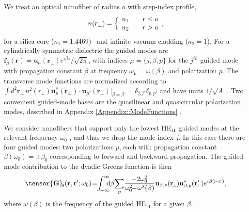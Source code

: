 \documentclass[preprint, aps,pra,onecolumn]{revtex4-1} %
\def\br{\mathbf{r}}
\newcommand{\mbf}[1]{\mathbf{#1}}
\begin{document}
We treat an optical nanofiber of radius $a$ with step-index profile,
	\begin{align} \label{Eq::IndexofRefraction}
		n(r_\perp) = \Big\{  
			\begin{array}{l l} n_1 & \quad r \leq a \\
						 n_2 & \quad r > a 
		\end{array},
	\end{align}
for a silica core ($n_1 = 1.4469$)~\cite{kien_field_2004} and infinite vacuum cladding ($n_2 = 1$).  For a cylindrically symmetric dielectric the guided modes are $\mathbf{f}_\mu (\br) = \mathbf{u}_\mu (\br_\perp) e^{i\beta z}/\sqrt{2 \pi}$, with indices $\mu=\{j, \beta , p\}$ for the $j^{th}$ guided mode with propagation constant $\beta$ at frequency $\omega_\mu=\omega(\beta)$ and polarization $p$.  The transverse mode functions are normalized according to $\int d^2 \mbf{r}_\perp \, n^2(r_\perp)\mathbf{u}^*_\mu (\br_\perp) \cdot \mathbf{u}_{\mu'} (\br_\perp)\big|_{\beta = \beta'} = \delta_{j,j'}\delta_{p,p'}$ and have units $1/\sqrt{A}$ \cite{le_kien_anisotropy_2014}.  Two convenient guided-mode bases are the quasilinear and quasicircular polarization modes, described in Appendix \ref{Appendix::ModeFunctions} \cite{kien_field_2004}.  

We consider nanofibers that support only the lowest HE$_{11}$ guided modes at the relevant frequency $\omega_0$ \cite{snyder_optical_1983}, and thus we drop the mode index $j$.  In this case there are four guided modes: two polarizations $p$, each with propagation constant $\beta(\omega_0) = \pm\beta_0$ corresponding to forward and backward propagation.  The guided-mode contribution to the dyadic Greens function is then 
	\begin{equation} \label{Eq::GreensEigenmodes}
		\tensor{\mathbf{G}}\!_g(\br,\br'; \omega_0) \!=\!\! \int_{\!-\infty}^\infty\!\!\!\! \mathrm{d} \beta \!\sum_{p}\! 
\frac{-2\omega_0^2}{\omega_0^2\!\!-\!\omega^2(\beta)} \mathbf{u}_{\beta,p} (\br\!_\perp)\mathbf{u}^*_{\beta,p} 
(\br_{\!\perp}^\prime) e^{i\beta(\!z\!-\!z'\!)},
	\end{equation}
where $ \omega(\beta)$ is the frequency of the guided HE$_{11}$ for a given $\beta$.  
\end{document}
